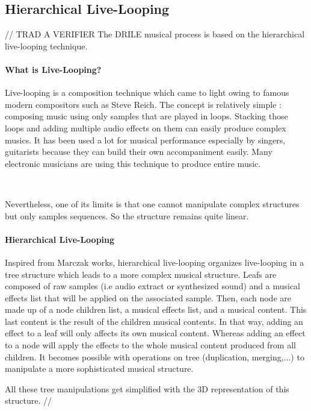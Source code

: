 \subsection{Hierarchical Live-Looping}
// TRAD A VERIFIER
The DRILE musical process is based on the hierarchical live-looping technique.

\paragraph{What is Live-Looping?}

Live-looping is a composition technique which came to light owing to famous modern compositors such as Steve Reich.
The concept is relatively simple : composing music using only samples that are played in loops. Stacking those loops and adding multiple audio effects on them can easily produce complex musics.
It has been used a lot for musical performance especially by singers, guitarists because they can build their own accompaniment easily. Many electronic musicians are using this technique to produce entire music.

~

Nevertheless, one of its limits is that one cannot manipulate complex structures but only samples sequences. So the structure remains quite linear.

\paragraph{Hierarchical Live-Looping}

Inspired from Marczak \cite{marczak2007etude} works, hierarchical live-looping organizes live-looping in a tree structure which leads to a more complex musical structure. Leafs are composed of raw samples (i.e audio extract or synthesized sound) and a musical effects list that will be applied on the associated sample. Then, each node are made up of a node children list, a musical effects list, and a musical content. This last content is the result of the children musical contents.
In that way, adding an effect to a leaf will only affects its own musical content. Whereas adding an effect to a node will apply the effects to the whole musical content produced from all children. It becomes possible with operations on tree (duplication, merging,...) to manipulate a more sophisticated musical structure. 

All these tree manipulations get simplified with the 3D representation of this structure.
//
